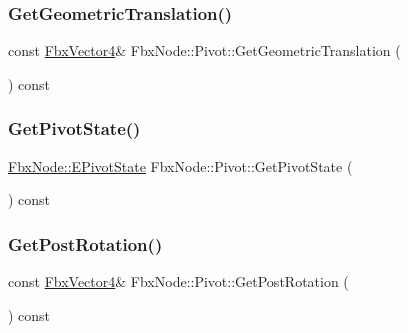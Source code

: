 \mbox{\label{class_fbx_node_1_1_pivot_a5ef7ba43adfefca3729cde5e54c687fd}} 
\subsubsection{\texorpdfstring{Get\+Geometric\+Translation()}{GetGeometricTranslation()}}
{\footnotesize\ttfamily const \hyperlink{class_fbx_vector4}{Fbx\+Vector4}\& Fbx\+Node\+::\+Pivot\+::\+Get\+Geometric\+Translation (\begin{DoxyParamCaption}{ }\end{DoxyParamCaption}) const}

\mbox{\label{class_fbx_node_1_1_pivot_a8ca16147fd0a4e3f96727cbb50abb144}} 
\subsubsection{\texorpdfstring{Get\+Pivot\+State()}{GetPivotState()}}
{\footnotesize\ttfamily \hyperlink{class_fbx_node_a153fc75958227fc6728a2233b630b58a}{Fbx\+Node\+::\+E\+Pivot\+State} Fbx\+Node\+::\+Pivot\+::\+Get\+Pivot\+State (\begin{DoxyParamCaption}{ }\end{DoxyParamCaption}) const}

\mbox{\label{class_fbx_node_1_1_pivot_aa3feddac1bf3ac072754b9135142278f}} 
\subsubsection{\texorpdfstring{Get\+Post\+Rotation()}{GetPostRotation()}}
{\footnotesize\ttfamily const \hyperlink{class_fbx_vector4}{Fbx\+Vector4}\& Fbx\+Node\+::\+Pivot\+::\+Get\+Post\+Rotation (\begin{DoxyParamCaption}{ }\end{DoxyParamCaption}) const}

